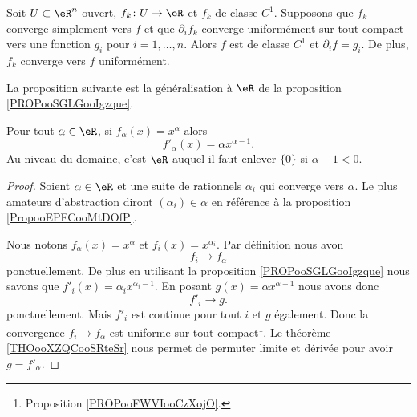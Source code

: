 \begin{theorem}		\label{ThoSerUnifDerr}
	Soit $U\subset\eR^n$ ouvert, $f_k\colon U\to \eR$ et $f_k$ de classe $C^1$. Supposons que $f_k$ converge simplement vers $f$ et que $\partial_if_k$ converge uniformément sur tout compact  vers une fonction $g_i$ pour $i=1,\ldots,n$. Alors $f$ est de classe $C^1$ et $\partial_if=g_i$. De plus, $f_k$ converge vers $f$ uniformément.
\end{theorem}

La proposition suivante est la généralisation à \( \eR\) de la proposition \ref{PROPooSGLGooIgzque}.
\begin{proposition}     \label{PROPooKIASooGngEDh}
    Pour tout \( \alpha\in \eR\), si \( f_{\alpha}(x)=x^{\alpha}\) alors
    \begin{equation}
        f'_{\alpha}(x)=\alpha x^{\alpha-1}.
    \end{equation}
    Au niveau du domaine, c'est \( \eR\) auquel il faut enlever \( \{ 0 \}\) si \( \alpha-1<0\).
\end{proposition}

\begin{proof}
    Soient \( \alpha\in \eR\) et une suite de rationnels \( \alpha_i\) qui converge vers \( \alpha\). Le plus amateurs d'abstraction diront \( (\alpha_i)\in \alpha\) en référence à la proposition \ref{PropooEPFCooMtDOfP}.

    Nous notons \( f_{\alpha}(x)=x^{\alpha}\) et \( f_i(x)=x^{\alpha_i}\). Par définition nous avon
    \begin{equation}
        f_i\to f_{\alpha}
    \end{equation}
    ponctuellement. De plus en utilisant la proposition \ref{PROPooSGLGooIgzque} nous savons que \( f'_i(x)=\alpha_i x^{\alpha_i-1}\). En posant \( g(x)=\alpha x^{\alpha-1}\) nous avons donc
    \begin{equation}
        f'_i\to g.
    \end{equation}
    ponctuellement. Mais \( f'_i\) est continue pour tout \( i\) et \( g\) également. Donc la convergence \( f_i\to f_{\alpha}\) est uniforme sur tout compact\footnote{Proposition \ref{PROPooFWVIooCzXojO}.}. Le théorème \ref{THOooXZQCooSRteSr} nous permet de permuter limite et dérivée pour avoir \( g=f'_{\alpha}\).
\end{proof}

